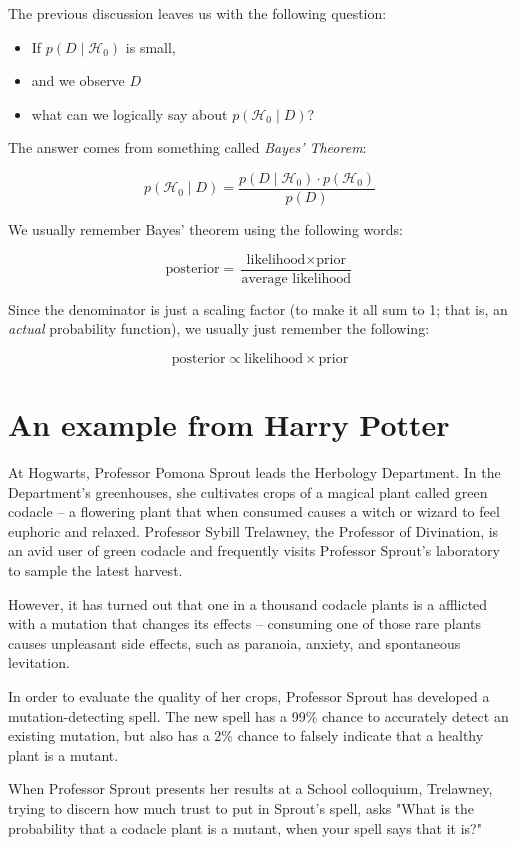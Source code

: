 \documentclass[11pt]{article}
\begin{document}
The previous discussion leaves us with the following question:
\begin{itemize}
\item If $p(D\mid \mathcal{H}_0)$ is small,
\item and we observe $D$
\item what can we logically say about $p(\mathcal{H}_0\mid D)$?
\end{itemize}

The answer comes from something called \emph{Bayes' Theorem}:

\[
p(\mathcal{H}_0\mid D) = \frac{p(D\mid \mathcal{H}_0) \cdot p(\mathcal{H}_0)}{p(D)}
\]

We usually remember Bayes' theorem using the following words:

\[
\text{posterior} = \frac{\text{likelihood} \times \text{prior}}{\text{average likelihood}}
\]

Since the denominator is just a scaling factor (to make it all sum to 1; that is, an \emph{actual} probability function), we usually just remember the following:

\[
\text{posterior} \propto \text{likelihood}\times \text{prior}
\]

\section*{An example from Harry Potter}
\label{sec-4}

At Hogwarts, Professor Pomona Sprout leads the Herbology Department. In the Department’s greenhouses, she cultivates crops of a magical plant called green codacle – a flowering plant that when consumed causes a witch or wizard to feel euphoric and relaxed. Professor Sybill Trelawney, the Professor of Divination, is an avid user of green codacle and frequently visits Professor Sprout’s laboratory to sample the latest harvest.

However, it has turned out that one in a thousand codacle plants is a afflicted with a mutation that changes its effects – consuming one of those rare plants causes unpleasant side effects, such as paranoia, anxiety, and spontaneous levitation.

In order to evaluate the quality of her crops, Professor Sprout has developed a mutation-detecting spell. The new spell has a 99\% chance to accurately detect an existing mutation, but also has a 2\% chance to falsely indicate that a healthy plant is a mutant.

When Professor Sprout presents her results at a School colloquium, Trelawney, trying to discern how much trust to put in Sprout’s spell, asks "What is the probability that a codacle plant is a mutant, when your spell says that it is?"
\end{document}
